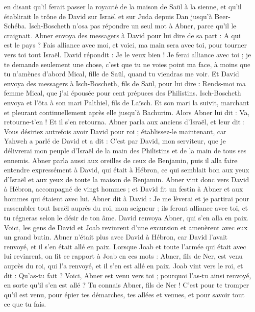 \begin{multicols}{2}
en disant qu'il ferait passer la royauté de la maison de Saül à la sienne, et qu'il établirait le trône de David sur Israël et sur Juda depuis Dan jusqu'à Beer-Schéba.
Isch-Boscheth n'osa pas répondre un seul mot à Abner, parce qu'il le craignait.
Abner envoya des messagers à David pour lui dire de sa part : A qui est le pays ? Fais alliance avec moi, et voici, ma main sera avec toi, pour tourner vers toi tout Israël.
David répondit : Je le veux bien ! Je ferai alliance avec toi ; je te demande seulement une chose, c'est que tu ne voies point ma face, à moins que tu n'amènes d'abord Mical, fille de Saül, quand tu viendras me voir.
Et David envoya des messagers à Isch-Boscheth, fils de Saül, pour lui dire : Rends-moi ma femme Mical, que j'ai épousée pour cent prépuces des Philistins.
Isch-Boscheth envoya et l'ôta à son mari Palthiel, fils de Laïsch.
Et son mari la suivit, marchant et pleurant continuellement après elle jusqu'à Bachurim. Alors Abner lui dit : Va, retourne-t'en ! Et il s'en retourna.
Abner parla aux anciens d'Israël, et leur dit : Vous désiriez autrefois avoir David pour roi ;
établissez-le maintenant, car Yahweh a parlé de David et a dit : C'est par David, mon serviteur, que je délivrerai mon peuple d'Israël de la main des Philistins et de la main de tous ses ennemis.
Abner parla aussi aux oreilles de ceux de Benjamin, puis il alla faire entendre expressément à David, qui était à Hébron, ce qui semblait bon aux yeux d'Israël et aux yeux de toute la maison de Benjamin.
Abner vint donc vers David à Hébron, accompagné de vingt hommes ; et David fit un festin à Abner et aux hommes qui étaient avec lui.
Abner dit à David : Je me lèverai et je partirai pour rassembler tout Israël auprès du roi, mon seigneur ; ils feront alliance avec toi, et tu régneras selon le désir de ton âme. David renvoya Abner, qui s'en alla en paix.
Voici, les gens de David et Joab revinrent d'une excursion et amenèrent avec eux un grand butin. Abner n'était plus avec David à Hébron, car David l'avait renvoyé, et il s'en était allé en paix.
Lorsque Joab et toute l'armée qui était avec lui revinrent, on fit ce rapport à Joab en ces mots : Abner, fils de Ner, est venu auprès du roi, qui l'a renvoyé, et il s'en est allé en paix.
Joab vint vers le roi, et dit : Qu'as-tu fait ? Voici, Abner est venu vers toi ; pourquoi l'as-tu ainsi renvoyé, en sorte qu'il s'en est allé ?
Tu connais Abner, fils de Ner ! C'est pour te tromper qu'il est venu, pour épier tes démarches, tes allées et venues, et pour savoir tout ce que tu fais.

\end{multicols}
